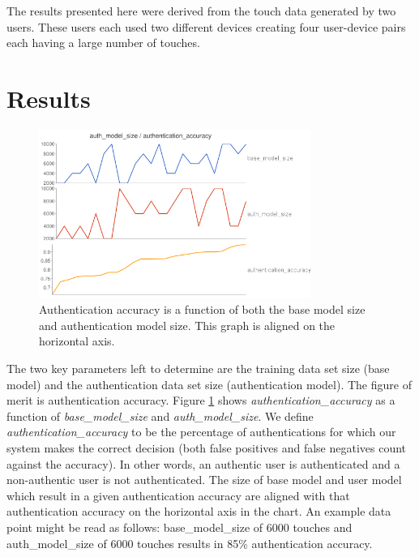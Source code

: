 \documentclass{acm_proc_article-sp}
\begin{document}
The results presented here were derived from the touch data generated by two users. These users each used two different devices creating four user-device pairs each having a large number of touches.



\section{Results}
\label{sec:results}

\begin{figure}
\centering
\includegraphics[width=3.5in]{authentication_accuracy_vs_model_size.png}
\caption{Authentication accuracy is a function of
both the base model size and authentication model size.
This graph is aligned on the horizontal axis.}
\label{fig:authentication_accuracy}
\end{figure}

%
The two key parameters left to determine are the training data set size (base model) and the 
authentication data set size (authentication model). The figure of merit is authentication accuracy.
Figure \ref{fig:authentication_accuracy} shows {\it authentication\_accuracy} as a function of {\it base\_model\_size} 
and {\it auth\_model\_size}. We define {\it authentication\_accuracy} to be the percentage of authentications for which our system makes the correct decision (both false positives and
false negatives count against the accuracy).
In other words, an authentic user is authenticated and a non-authentic user is not authenticated.
The size of base model and user model which result in a given authentication accuracy are aligned with that authentication accuracy on the horizontal axis in the chart.
An example data point
might be read as follows: base\_model\_size of
6000 touches and auth\_model\_size of 6000 touches
results in 85\% authentication accuracy.
\end{document}
